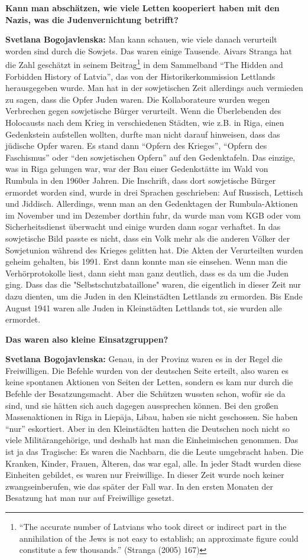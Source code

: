 \textbf{Kann man abschätzen, wie viele Letten kooperiert haben mit den Nazis, was die Judenvernichtung betrifft?}

\textbf{Svetlana Bogojavlenska:} Man kann schauen, wie viele danach verurteilt worden sind durch die Sowjets. Das waren einige Tausende. Aivars Stranga hat die Zahl geschätzt in seinem Beitrag\footnote{“The accurate number of Latvians who took direct or indirect part in the annihilation of the Jews is not easy to establish; an approximate figure could constitute a few thousands.” (Stranga (2005) 167) } in dem Sammelband "`The Hidden and Forbidden History of Latvia"', das von der Historikerkommission Lettlands herausgegeben wurde. Man hat in der sowjetischen Zeit allerdings auch vermieden zu sagen, dass die Opfer Juden waren. Die Kollaborateure wurden wegen Verbrechen gegen sowjetische Bürger verurteilt. Wenn die Überlebenden des Holocausts nach dem Krieg in verschiedenen Städten, wie z.B. in Riga, einen Gedenkstein aufstellen wollten, durfte man nicht darauf hinweisen, dass das jüdische Opfer waren. Es stand dann "`Opfern des Krieges"', "`Opfern des Faschismus"' oder "`den sowjetischen Opfern"' auf den Gedenktafeln. Das einzige, was in Riga gelungen war, war der Bau einer Gedenkstätte im Wald von Rumbula in den 1960er Jahren. Die Inschrift, dass dort sowjetische Bürger ermordet worden sind, wurde in drei Sprachen geschrieben: Auf Russisch, Lettisch und Jiddisch. Allerdings, wenn man an den Gedenktagen der Rumbula-Aktionen im November und im Dezember dorthin fuhr, da wurde man vom KGB oder vom Sicherheitsdienst überwacht und einige wurden dann sogar verhaftet. In das sowjetische Bild passte es nicht, dass ein Volk mehr als die anderen Völker der Sowjetunion während des Krieges gelitten hat. Die Akten der Verurteilten wurden geheim gehalten, bis 1991. Erst dann konnte man sie einsehen. Wenn man die Verhörprotokolle liest, dann sieht man ganz deutlich, dass es da um die Juden ging. Dass das die "Selbstschutzbataillone" waren, die eigentlich in dieser Zeit nur dazu dienten, um die Juden in den Kleinstädten Lettlands zu ermorden. Bis Ende August 1941 waren alle Juden in Kleinstädten Lettlands tot, sie wurden alle ermordet.
 
\textbf{Das waren also kleine Einsatzgruppen?}

\textbf{Svetlana Bogojavlenska:} Genau, in der Provinz waren es in der Regel die Freiwilligen. Die Befehle wurden von der deutschen Seite erteilt, also waren es keine spontanen Aktionen von Seiten der Letten, sondern es kam nur durch die Befehle der Besatzungsmacht. Aber die Schützen wussten schon, wofür sie da sind, und sie hätten sich auch dagegen aussprechen können.
Bei den großen Massenaktionen in Riga in Liepāja, Libau, haben sie nicht geschossen. Sie haben "`nur"' eskortiert. Aber in den Kleinstädten hatten die Deutschen noch nicht so viele Militärangehörige, und deshalb hat man die Einheimischen genommen. Das ist ja das Tragische: Es waren die Nachbarn, die die Leute umgebracht haben. Die Kranken, Kinder, Frauen, Älteren, das war egal, alle. In jeder Stadt wurden diese Einheiten gebildet, es waren nur Freiwillige. In dieser Zeit wurde noch keiner zwangseinberufen, wie das später der Fall war. In den ersten Monaten der Besatzung hat man nur auf Freiwillige gesetzt.

